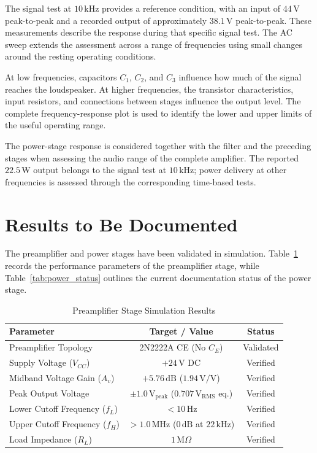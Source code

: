 \documentclass[conference]{IEEEtran}
\begin{document}
The signal test at $10\,\mathrm{kHz}$ provides a reference condition, with an input of $44\,\mathrm{V}$ peak-to-peak and a recorded output of approximately $38.1\,\mathrm{V}$ peak-to-peak. These measurements describe the response during that specific signal test. The AC sweep extends the assessment across a range of frequencies using small changes around the resting operating conditions.

At low frequencies, capacitors $C_1$, $C_2$, and $C_3$ influence how much of the signal reaches the loudspeaker. At higher frequencies, the transistor characteristics, input resistors, and connections between stages influence the output level. The complete frequency-response plot is used to identify the lower and upper limits of the useful operating range.

The power-stage response is considered together with the filter and the preceding stages when assessing the audio range of the complete amplifier. The reported $22.5\,\mathrm{W}$ output belongs to the signal test at $10\,\mathrm{kHz}$; power delivery at other frequencies is assessed through the corresponding time-based tests.

\section{Results to Be Documented}
The preamplifier and power stages have been validated in simulation. Table~\ref{tab:preamp_results} records the performance parameters of the preamplifier stage, while Table~\ref{tab:power_status} outlines the current documentation status of the power stage.

\begin{table}[H]
\caption{Preamplifier Stage Simulation Results}
\label{tab:preamp_results}
\centering
\begin{tabular}{lcc}
\toprule
Parameter & Target / Value & Status \\
\midrule
Preamplifier Topology & 2N2222A CE (No $C_E$) & Validated \\
Supply Voltage ($V_{CC}$) & $+24\,\mathrm{V}$ DC & Verified \\
Midband Voltage Gain ($A_v$) & $+5.76\,\mathrm{dB}$ ($1.94\,\mathrm{V/V}$) & Verified \\
Peak Output Voltage & $\pm1.0\,\mathrm{V_{peak}}$ ($0.707\,\mathrm{V_{RMS}}$ eq.) & Verified \\
Lower Cutoff Frequency ($f_L$) & $<10\,\mathrm{Hz}$ & Verified \\
Upper Cutoff Frequency ($f_H$) & $>1.0\,\mathrm{MHz}$ ($0\,\mathrm{dB}$ at $22\,\mathrm{kHz}$) & Verified \\
Load Impedance ($R_L$) & $1\,\mathrm{M}\Omega$ & Verified \\
\bottomrule
\end{tabular}
\end{table}
\end{document}
